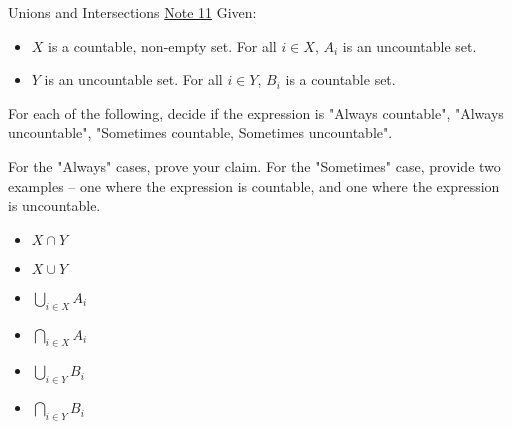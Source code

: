 \begin{homeworkProblem}{Unions and Intersections}
\href{https://www.eecs70.org/assets/pdf/notes/n11.pdf}{Note 11}
Given:
\begin{itemize}
\item $X$ is a countable, non-empty set. For all $i \in X$, $A_i$ is an 
uncountable set.
\item $Y$ is an uncountable set. For all $i \in Y$, $B_i$ is a countable set.
\end{itemize}

For each of the following, decide if the expression is
"Always countable", "Always uncountable", "Sometimes countable,
Sometimes uncountable".

For the "Always" cases, prove your claim. For the "Sometimes" case, provide
two examples -- one where the expression is countable, and one where
the expression is uncountable.

\begin{itemize}

\item $X \cap Y$

\solution

\item $X \cup Y$

\solution

\item $\bigcup_{i \in X} A_i$

\solution

\item $\bigcap_{i \in X} A_i$

\solution

\item $\bigcup_{i \in Y} B_i$

\solution

\item $\bigcap_{i \in Y} B_i$

\solution

\end{itemize}
\end{homeworkProblem}
